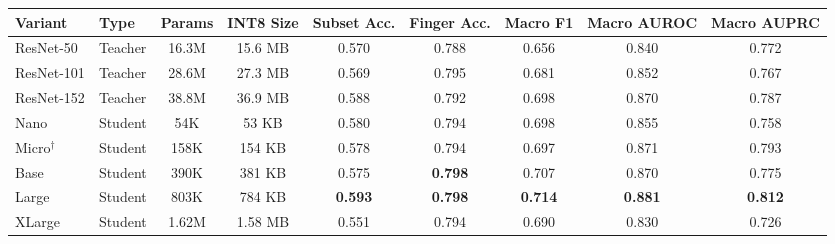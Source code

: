 \begin{tabular}{llccccccc}
\toprule
Variant & Type & Params & INT8 Size & Subset Acc. & Finger Acc. & Macro F1 & Macro AUROC & Macro AUPRC \\
\midrule
ResNet-50  & Teacher & 16.3M & 15.6 MB & 0.570 & 0.788 & 0.656 & 0.840 & 0.772 \\
ResNet-101 & Teacher & 28.6M & 27.3 MB & 0.569 & 0.795 & 0.681 & 0.852 & 0.767 \\
ResNet-152 & Teacher & 38.8M & 36.9 MB & 0.588 & 0.792 & 0.698 & 0.870 & 0.787 \\
\midrule
Nano        & Student & 54K   & 53 KB   & 0.580 & 0.794 & 0.698 & 0.855 & 0.758 \\
Micro$^\dagger$ & Student & 158K  & 154 KB  & 0.578 & 0.794 & 0.697 & 0.871 & 0.793 \\
Base        & Student & 390K  & 381 KB  & 0.575 & \textbf{0.798} & 0.707 & 0.870 & 0.775 \\
Large       & Student & 803K  & 784 KB  & \textbf{0.593} & \textbf{0.798} & \textbf{0.714} & \textbf{0.881} & \textbf{0.812} \\
XLarge      & Student & 1.62M & 1.58 MB & 0.551 & 0.794 & 0.690 & 0.830 & 0.726 \\
\bottomrule
\end{tabular}
